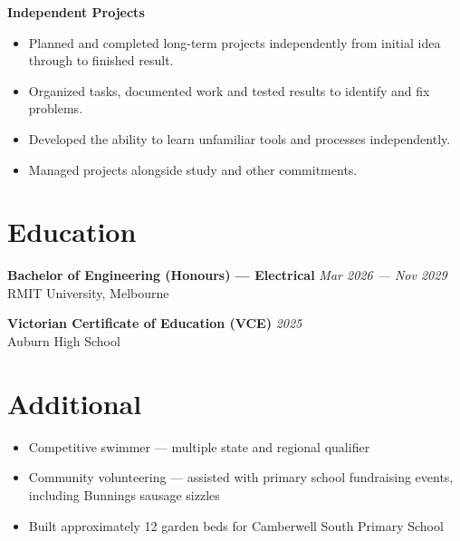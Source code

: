 \documentclass[11pt,a4paper]{article}
\begin{document}
\space

\noindent\textbf{Independent Projects}
\begin{itemize}[leftmargin=*, noitemsep, topsep=2pt]
\item Planned and completed long-term projects independently from initial idea through to finished result.
\item Organized tasks, documented work and tested results to identify and fix problems.
\item Developed the ability to learn unfamiliar tools and processes independently.
\item Managed projects alongside study and other commitments.
\end{itemize}

\section*{Education}

\noindent\textbf{Bachelor of Engineering (Honours) --- Electrical} \hspace*{\fill} \textit{Mar 2026 --- Nov 2029} \\
RMIT University, Melbourne

\noindent\textbf{Victorian Certificate of Education (VCE)} \hspace*{\fill} \textit{2025} \\
Auburn High School

\section*{Additional}
\begin{itemize}[leftmargin=*, noitemsep, topsep=2pt]
\item Competitive swimmer --- multiple state and regional qualifier
\item Community volunteering --- assisted with primary school fundraising events, including Bunnings sausage sizzles
\item Built approximately 12 garden beds for Camberwell South Primary School
\end{itemize}
\end{document}
